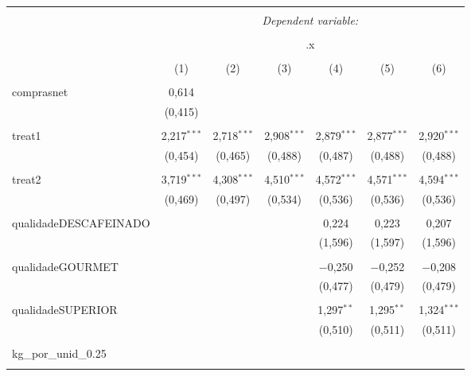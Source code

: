 
\begin{table}[!htbp] \centering 
  \caption{} 
  \label{} 
\begin{tabular}{@{\extracolsep{5pt}}lcccccc} 
\\[-1.8ex]\hline 
\hline \\[-1.8ex] 
 & \multicolumn{6}{c}{\textit{Dependent variable:}} \\ 
\cline{2-7} 
\\[-1.8ex] & \multicolumn{6}{c}{.x} \\ 
\\[-1.8ex] & (1) & (2) & (3) & (4) & (5) & (6)\\ 
\hline \\[-1.8ex] 
 comprasnet & 0,614 &  &  &  &  &  \\ 
  & (0,415) &  &  &  &  &  \\ 
  & & & & & & \\ 
 treat1 & 2,217$^{***}$ & 2,718$^{***}$ & 2,908$^{***}$ & 2,879$^{***}$ & 2,877$^{***}$ & 2,920$^{***}$ \\ 
  & (0,454) & (0,465) & (0,488) & (0,487) & (0,488) & (0,488) \\ 
  & & & & & & \\ 
 treat2 & 3,719$^{***}$ & 4,308$^{***}$ & 4,510$^{***}$ & 4,572$^{***}$ & 4,571$^{***}$ & 4,594$^{***}$ \\ 
  & (0,469) & (0,497) & (0,534) & (0,536) & (0,536) & (0,536) \\ 
  & & & & & & \\ 
 qualidadeDESCAFEINADO &  &  &  & 0,224 & 0,223 & 0,207 \\ 
  &  &  &  & (1,596) & (1,597) & (1,596) \\ 
  & & & & & & \\ 
 qualidadeGOURMET &  &  &  & $-$0,250 & $-$0,252 & $-$0,208 \\ 
  &  &  &  & (0,477) & (0,479) & (0,479) \\ 
  & & & & & & \\ 
 qualidadeSUPERIOR &  &  &  & 1,297$^{**}$ & 1,295$^{**}$ & 1,324$^{***}$ \\ 
  &  &  &  & (0,510) & (0,511) & (0,511) \\ 
  & & & & & & \\ 
 kg\_por\_unid\_0.25 &  &  &  &  &  &  \\ 
  &  &  &  &  &  &  \\ 

\end{tabular}
\end{table}
